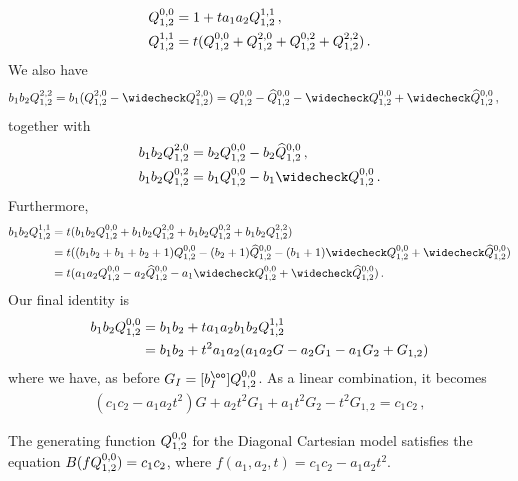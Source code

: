 	\begin{align}
		Q_{1,2}^{0,0} &= 1 + ta_1a_2 Q_{1,2}^{1,1}\,,\\
		Q_{1,2}^{1,1} &= t(Q_{1,2}^{0,0} + Q_{1,2}^{2,0} + Q_{1,2}^{0,2} + Q_{1,2}^{2,2})\,.
	\end{align}
We also have
	\begin{align}
		b_1b_2\Qf{2,2} &= b_1(\Qf{2,0}-\wc Q_{1,2}^{2,0}) = \Qf{0,0}-\wh Q_{1,2}^{0,0}-\wc Q_{1,2}^{0,0} + \wch Q_{1,2}^{0,0}\,,
	\end{align}
together with
	\begin{align}
		b_1b_2\Qf{2,0} &= b_2 \Qf{0,0} - b_2 \wh Q_{1,2}^{0,0}\,,\\
		b_1b_2\Qf{0,2} &= b_1 \Qf{0,0} - b_1 \wc Q_{1,2}^{0,0}\,.
	\end{align}
Furthermore,
\begin{align}
	\begin{split}
		b_1b_2\Qf{1,1} &= t(b_1b_2\Qf{0,0} + b_1b_2\Qf{2,0} + b_1b_2\Qf{0,2} + b_1b_2\Qf{2,2})\\
		&= t((b_1b_2 + b_1 + b_2 + 1)\Qf{0,0}-(b_2 + 1)\wh Q_{1,2}^{0,0}-(b_1 + 1)\wc Q_{1,2}^{0,0} + \wch Q_{1,2}^{0,0})\\
		&=t(a_1a_2\Qf{0,0}-a_2\wh Q_{1,2}^{0,0}-a_1\wc Q_{1,2}^{0,0} + \wch Q_{1,2}^{0,0})\,.
	\end{split}
\end{align}
Our final identity is
\begin{align}
	\begin{split}
		b_1b_2Q_{1,2}^{0,0} &= b_1b_2 + ta_1a_2b_1b_2Q_{1,2}^{1,1}\\
		& = b_1b_2 + t^2a_1a_2(a_1a_2G-a_2G_1-a_1G_2 + G_{1,2})
	\end{split}
\end{align}
where we have, as before $G_I = [b_I^\oo]\Qf{0,0}$. As a linear combination, it becomes
\begin{align}
	(c_1c_2-a_1a_2t^2)G + a_2t^2G_1 + a_1t^2G_2-t^2G_{1,2}=c_1c_2\,,
\end{align}

\begin{thm} The generating function $Q_{1,2}^{0,0}$ for the Diagonal Cartesian model satisfies the equation $B(fQ_{1,2}^{0,0}) = c_1c_2$, where $f(a_1,a_2,t) = c_1c_2-a_1a_2t^2$.
\end{thm}
